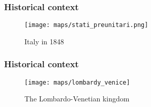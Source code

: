 \documentclass[10pt]{beamer}
\begin{document}
\begin{frame}
    \frametitle{Historical context}
    
    \begin{figure}
        \centering
        \texttt{[image: maps/stati\_preunitari.png]}
        \caption{Italy in 1848}
        \label{fig:map_italy_1848}
    \end{figure}
    
\end{frame}

\iffalse
\begin{frame}
    \frametitle{Historical context}
    
    \begin{figure}
        \centering
        \texttt{[image: maps/austrian\_empire\_1855.jpg]}
        \caption{The Austrian empire in 1855}
        \label{fig:map_austria_1855}
    \end{figure}
    
\end{frame}
\fi

\begin{frame}
    \frametitle{Historical context}
    
    \begin{figure}
        \centering
        \texttt{[image: maps/lombardy\_venice]}
        \caption{The Lombardo-Venetian kingdom}
        \label{fig:map_lombardy_venice}
    \end{figure}
    
\end{frame}
\end{document}
